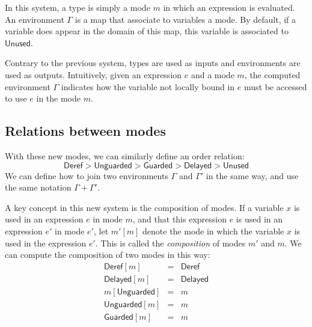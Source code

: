 \documentclass{article}
\newcommand{\Deref}{\mathsf{Deref}}
\newcommand{\Unguarded}{\mathsf{Unguarded}}
\newcommand{\Guarded}{\mathsf{Guarded}}
\newcommand{\Delayed}{\mathsf{Delayed}}
\newcommand{\Unused}{\mathsf{Unused}}
\begin{document}
In this system, a type is simply a mode $m$ in which an expression is
evaluated. An environment $\Gamma$ is a map that associate to variables a mode.
By default, if a variable does appear in the domain of this map, this variable
is associated to $\Unused$.

Contrary to the previous system, types are used as inputs and environments are
used as outputs. Intuitively, given an expression $e$ and a mode $m$, the
computed environment $\Gamma$ indicates how the variable not locally bound in
$e$ must be accessed to use $e$ in the mode $m$.

\subsection{Relations between modes}
With these new modes, we can similarly define an order relation:
$$\Deref > \Unguarded > \Guarded > \Delayed > \Unused$$
We can define how to join two environments $\Gamma$ and $\Gamma'$ in the same
way, and use the same notation $\Gamma + \Gamma'$.

A key concept in this new system is the composition of modes. If a variable $x$
is used in an expression $e$ in mode $m$, and that this expression $e$ is used
in an expression $e'$ in mode $e'$, let $m'[m]$ denote the mode in which the
variable $x$ is used in the expression $e'$. This is called the
\textit{composition} of modes $m'$ and $m$.  We can compute the composition of two modes in this way: \begin{displaymath} \begin{array}{lll} \Deref [m]     & = & \Deref   \\
    \Delayed [m]   & = & \Delayed \\
    m[\Unguarded]  & = & m        \\
    \Unguarded [m] & = & m        \\
    \Guarded [m]   & = & m        \\
  \end{array}
\end{displaymath}

\end{document}
